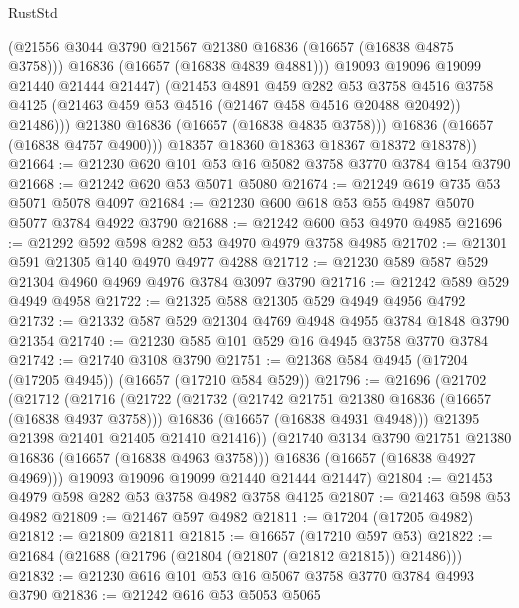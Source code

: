 \begin{lexlean}{RustStd}
\begin{coremodule}
                    (@21556 @3044 @3790 @21567 @21380 @16836 (@16657 (@16838 @4875 @3758)))
                    @16836
                    (@16657 (@16838 @4839 @4881)))
                  @19093
                  @19096
                  @19099
                  @21440
                  @21444
                  @21447)
                (@21453
                  @4891
                  @459
                  @282
                  @53
                  @3758
                  @4516
                  @3758
                  @4125
                  (@21463 @459 @53 @4516 (@21467 @458 @4516 @20488 @20492))
                  @21486)))
            @21380
            @16836
            (@16657 (@16838 @4835 @3758)))
          @16836
          (@16657 (@16838 @4757 @4900)))
        @18357
        @18360
        @18363
        @18367
        @18372
        @18378))
@21664 := @21230 @620 @101 @53 @16 @5082 @3758 @3770 @3784 @154 @3790
@21668 := @21242 @620 @53 @5071 @5080
@21674 := @21249 @619 @735 @53 @5071 @5078 @4097
@21684 := @21230 @600 @618 @53 @55 @4987 @5070 @5077 @3784 @4922 @3790
@21688 := @21242 @600 @53 @4970 @4985
@21696 := @21292 @592 @598 @282 @53 @4970 @4979 @3758 @4985
@21702 := @21301 @591 @21305 @140 @4970 @4977 @4288
@21712 := @21230 @589 @587 @529 @21304 @4960 @4969 @4976 @3784 @3097 @3790
@21716 := @21242 @589 @529 @4949 @4958
@21722 := @21325 @588 @21305 @529 @4949 @4956 @4792
@21732 := @21332 @587 @529 @21304 @4769 @4948 @4955 @3784 @1848 @3790 @21354
@21740 := @21230 @585 @101 @529 @16 @4945 @3758 @3770 @3784
@21742 := @21740 @3108 @3790
@21751 := @21368 @584 @4945 (@17204 (@17205 @4945)) (@16657 (@17210 @584 @529))
@21796 := @21696
    (@21702
      (@21712
        (@21716
          (@21722
            (@21732
              (@21742 @21751 @21380 @16836 (@16657 (@16838 @4937 @3758)))
              @16836
              (@16657 (@16838 @4931 @4948)))
            @21395
            @21398
            @21401
            @21405
            @21410
            @21416))
        (@21740 @3134 @3790 @21751 @21380 @16836 (@16657 (@16838 @4963 @3758)))
        @16836
        (@16657 (@16838 @4927 @4969)))
      @19093
      @19096
      @19099
      @21440
      @21444
      @21447)
@21804 := @21453 @4979 @598 @282 @53 @3758 @4982 @3758 @4125
@21807 := @21463 @598 @53 @4982
@21809 := @21467 @597 @4982
@21811 := @17204 (@17205 @4982)
@21812 := @21809 @21811
@21815 := @16657 (@17210 @597 @53)
@21822 := @21684 (@21688 (@21796 (@21804 (@21807 (@21812 @21815)) @21486)))
@21832 := @21230 @616 @101 @53 @16 @5067 @3758 @3770 @3784 @4993 @3790
@21836 := @21242 @616 @53 @5053 @5065

\end{coremodule}
\end{lexlean}
